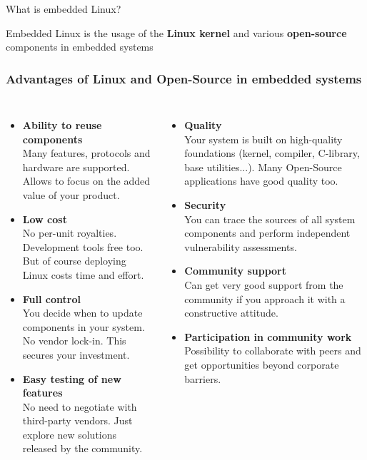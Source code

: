 \begin{frame}{What is embedded Linux?}
  \huge
  \begin{center}
    Embedded Linux is the usage of the {\bf Linux kernel} and various
    {\bf open-source} components in embedded systems
  \end{center}
\end{frame}

\begin{frame}
  \frametitle{Advantages of Linux and Open-Source in embedded systems}
  \footnotesize
  \begin{columns}
     \begin{itemize}
     \item {\bf Ability to reuse components}\\
           Many features, protocols and hardware are supported.
           Allows to focus on the added value of your product.
     \item {\bf Low cost}\\
           No per-unit royalties. Development tools free
	   too. But of course deploying Linux costs time and effort.
     \item {\bf Full control}\\
           You decide when to update components in your
	   system. No vendor lock-in. This secures your investment.
     \item {\bf Easy testing of new features}\\
           No need to negotiate with third-party vendors. Just explore
	   new solutions released by the community.
     \end{itemize}
     \begin{itemize}
     \item {\bf Quality}\\
           Your system is built on high-quality foundations
           (kernel, compiler, C-library, base utilities...). Many
           Open-Source applications have good quality too.
     \item {\bf Security}\\
           You can trace the sources of all system components
           and perform independent vulnerability assessments.
     \item {\bf Community support}\\
           Can get very good support from the
	   community if you approach it with a constructive attitude.
     \item {\bf Participation in community work}\\
	   Possibility to collaborate with peers and get opportunities
           beyond corporate barriers.
     \end{itemize}
  \end{columns}
\end{frame}

